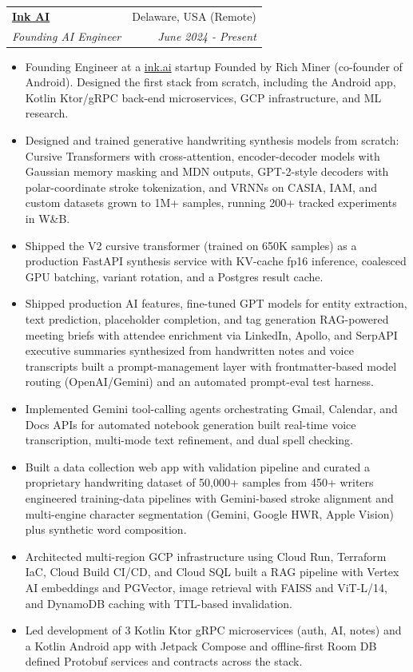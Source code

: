 \documentclass[letterpaper,11pt]{article}
\makeatletter
\newcommand{\resumeItem}[1]{
  \item\small{
    {#1 \vspace{-2pt}}
  }
}
\newcommand{\resumeSubheading}[4]{
  \vspace{-2pt}\item
    \begin{tabular*}{0.97\textwidth}[t]{l@{\extracolsep{\fill}}r}
      \textbf{#1} & #2 \\
      \textit{\small#3} & \textit{\small #4} \\
    \end{tabular*}\vspace{-7pt}
}
\newcommand{\resumeItemListStart}{\begin{itemize}}
\newcommand{\resumeItemListEnd}{\end{itemize}\vspace{-5pt}}
\makeatother
\begin{document}
    \resumeSubheading
      {\href{https://ink.ai/}{Ink AI}}{Delaware, USA (Remote)}
      {Founding AI Engineer}{June 2024 - Present}
        \resumeItemListStart
          \resumeItem{Founding Engineer at a \href{https://ink.ai/}{ink.ai} startup Founded by Rich Miner (co-founder of Android). Designed the first stack from scratch, including the Android app, Kotlin Ktor/gRPC back-end microservices, GCP infrastructure, and ML research.}
          \resumeItem{Designed and trained generative handwriting synthesis models from scratch: Cursive Transformers with cross-attention, encoder-decoder models with Gaussian memory masking and MDN outputs, GPT-2-style decoders with polar-coordinate stroke tokenization, and VRNNs on CASIA, IAM, and custom datasets grown to 1M+ samples, running 200+ tracked experiments in W\&B.}
          \resumeItem{Shipped the V2 cursive transformer (trained on 650K samples) as a production FastAPI synthesis service with KV-cache fp16 inference, coalesced GPU batching, variant rotation, and a Postgres result cache.}
          \resumeItem{Shipped production AI features, fine-tuned GPT models for entity extraction, text prediction, placeholder completion, and tag generation RAG-powered meeting briefs with attendee enrichment via LinkedIn, Apollo, and SerpAPI executive summaries synthesized from handwritten notes and voice transcripts built a prompt-management layer with frontmatter-based model routing (OpenAI/Gemini) and an automated prompt-eval test harness.}
          \resumeItem{Implemented Gemini tool-calling agents orchestrating Gmail, Calendar, and Docs APIs for automated notebook generation built real-time voice transcription, multi-mode text refinement, and dual spell checking.}
          \resumeItem{Built a data collection web app with validation pipeline and curated a proprietary handwriting dataset of 50{,}000+ samples from 450+ writers engineered training-data pipelines with Gemini-based stroke alignment and multi-engine character segmentation (Gemini, Google HWR, Apple Vision) plus synthetic word composition.}
          \resumeItem{Architected multi-region GCP infrastructure using Cloud Run, Terraform IaC, Cloud Build CI/CD, and Cloud SQL built a RAG pipeline with Vertex AI embeddings and PGVector, image retrieval with FAISS and ViT-L/14, and DynamoDB caching with TTL-based invalidation.}
          \resumeItem{Led development of 3 Kotlin Ktor gRPC microservices (auth, AI, notes) and a Kotlin Android app with Jetpack Compose and offline-first Room DB defined Protobuf services and contracts across the stack.}
        \resumeItemListEnd
\end{document}
